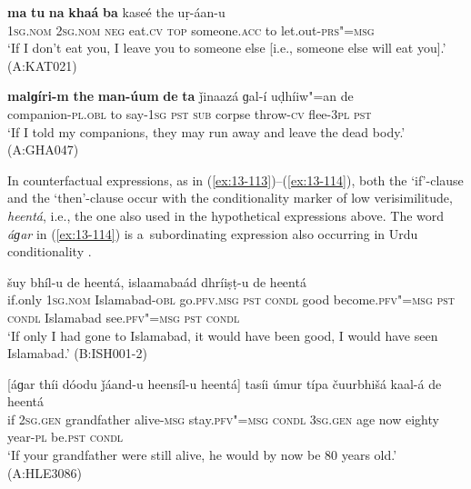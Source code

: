 \begin{exe}
\ex
\label{ex:13-110}
\gll \textbf{ma} \textbf{tu} \textbf{na} \textbf{khaá} \textbf{ba} kaseé the  uṛ-áan-u \\
\textsc{1sg.nom} \textsc{2sg.nom} \textsc{neg} eat.\textsc{cv} \textsc{top} someone.\textsc{acc} to let.out-\textsc{prs"=msg} \\
\glt `If I don't eat you, I leave you to someone else [i.e., someone else will eat you].' (A:KAT021)

\ex
\label{ex:13-111}
\gll \label{bkm:Ref190830313}\textbf{malɡíri-m} \textbf{the} \textbf{man-úum} \textbf{de} \textbf{ta} ǰinaazá  ɡal-í uḍhíiw"=an de\\
companion-\textsc{pl.obl} to say-\textsc{1sg} \textsc{ pst} \textsc{sub} corpse throw-\textsc{cv} flee-\textsc{3pl} \textsc{ pst}\\
\glt `If I told my companions, they may run away and leave the dead body.' (A:GHA047) 
\end{exe}

 In counterfactual expressions, as in (\ref{ex:13-113})--(\ref{ex:13-114}), both the `if'-clause and the `then'-clause occur with the conditionality marker of low verisimilitude, \textit{heentá}, i.e., the one also used in the hypothetical expressions above. The word \textit{áɡar} in (\ref{ex:13-114}) is a~subordinating expression also occurring in Urdu conditionality \citep[101--103]{schmidt1999}.

\begin{exe}
\ex
\label{ex:13-113}
 šuy bhíl-u de heentá,
islaamabaád  dhríiṣṭ-u de heentá \\
if.only \textsc{1sg.nom} Islamabad-\textsc{obl} go.\textsc{pfv.msg} \textsc{pst}  \textsc{condl} good become.\textsc{pfv"=msg} \textsc{pst} \textsc{condl} Islamabad see.\textsc{pfv"=msg} \textsc{pst} \textsc{condl} \\
\glt `If only I had gone to Islamabad, it would have been good, I would have seen Islamabad.' (B:ISH001-2)

\ex
\label{ex:13-114}
\gll \label{bkm:Ref190830564}[áɡar thíi dóodu ǰáand-u heensíl-u  heentá]
tasíi úmur típa čuurbhišá kaal-á de  heentá \\
if \textsc{2sg.gen} grandfather alive-\textsc{msg} stay.\textsc{pfv"=msg}  \textsc{condl} 
\textsc{3sg.gen} age now eighty year-\textsc{pl} be.\textsc{pst} \textsc{condl} \\
\glt `If your grandfather were still alive, he would by now be 80 years old.' (A:HLE3086) 
\end{exe}

